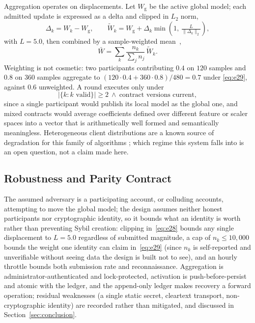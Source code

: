 Aggregation operates on displacements. Let $W_{\mathrm{g}}$ be the active
global model; each admitted update is expressed as a delta and clipped in
$L_2$ norm,
\begin{equation}\label{eq:e28}
\Delta_k = W_k - W_{\mathrm{g}}, \qquad
\tilde{W}_k = W_{\mathrm{g}} + \Delta_k \min\!\left(1,\ \tfrac{L}{\lVert \Delta_k \rVert_2}\right),
\end{equation}
with $L{=}5.0$, then combined by a sample-weighted mean~\cite{mcmahan2017},
\begin{equation}\label{eq:e29}
\bar{W} = \sum_k \frac{n_k}{\sum_j n_j}\, \tilde{W}_k .
\end{equation}
Weighting is not cosmetic: two participants contributing $0.4$ on $120$
samples and $0.8$ on $360$ samples aggregate to $(120\cdot0.4+360\cdot0.8)/480=0.7$
under \eqref{eq:e29}, against $0.6$ unweighted. A round executes only under
\begin{equation}\label{eq:e30}
\bigl|\{k : k \text{ valid}\}\bigr| \geq 2 \ \wedge \ \text{contract versions current},
\end{equation}
since a single participant would publish its local model as the global one,
and mixed contracts would average coefficients defined over different feature
or scaler spaces into a vector that is arithmetically well formed and
semantically meaningless. Heterogeneous client distributions are a known
source of degradation for this family of algorithms
\cite{li2020challenges,li2020noniid}; which regime this system falls into is an
open question, not a claim made here.

\subsection{Robustness and Parity Contract}

The assumed adversary is a participating account, or colluding accounts,
attempting to move the global model; the design assumes neither honest
participants nor cryptographic identity, so it bounds what an identity is
worth rather than preventing Sybil creation: clipping in~\eqref{eq:e28} bounds
any single displacement to $L{=}5.0$ regardless of submitted magnitude, a cap
of $n_k\leq10{,}000$ bounds the weight one identity can claim
in~\eqref{eq:e29} (since $n_k$ is self-reported and unverifiable without
seeing data the design is built not to see), and an hourly throttle bounds
both submission rate and reconnaissance. Aggregation is
administrator-authenticated and lock-protected, activation is
push-before-persist and atomic with the ledger, and the append-only ledger
makes recovery a forward operation; residual weaknesses (a single static
secret, cleartext transport, non-cryptographic identity) are recorded rather
than mitigated, and discussed in Section~\ref{sec:conclusion}.

